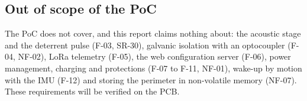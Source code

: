 \subsection{Out of scope of the PoC}

The PoC does not cover, and this report claims nothing about: the acoustic stage and the deterrent pulse
(F-03, SR-30), galvanic isolation with an optocoupler (F-04, NF-02), LoRa telemetry (F-05), the web
configuration server (F-06), power management, charging and protections (F-07 to F-11, NF-01), wake-up by
motion with the IMU (F-12) and storing the perimeter in non-volatile memory (NF-07). These requirements will
be verified on the PCB.
